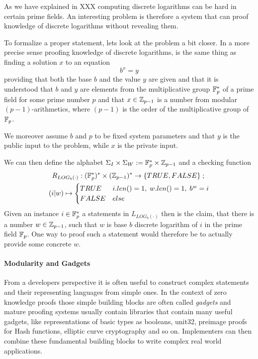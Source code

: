 \begin{example} As we have explained in XXX computing discrete logarithms can be hard in certain prime fields. An interesting problem is therefore a system that can proof knowledge of discrete logarithms without revealing them.

To formalize a proper statement, lets look at the problem a bit closer. In a more precise sense proofing knowledge of discrete logarithms, is the same thing as finding a solution $x$ to an equation
$$
b^x = y
$$ 
providing that both the base $b$ and the value $y$ are given and that it is understood that $b$ and $y$ are elements from the multiplicative group $\mathbb{F}_{p}^*$ of a prime field for some prime number $p$ and that $x\in \mathbb{Z}_{p-1}$ is a number from modular $(p-1)$-arithmetics, where $(p-1)$ is the order of the multiplicative group of $\mathbb{F}_p$.

We moreover assume $b$ and $p$ to be fixed system parameters and that $y$ is the public input to the problem, while $x$ is the private input. 

We can then define the alphabet $\Sigma_I \times \Sigma_W := \mathbb{F}_p^* \times \mathbb{Z}_{p-1}$ and a checking function
\begin{multline*}
R_{LOG_b(\cdot)} : (\mathbb{F}_p^*)^* \times (\mathbb{Z}_{p-1})^* \to \{TRUE, FALSE\}\;;\;\\
(i|w) \mapsto
\begin{cases}
TRUE & i.len()=1,\; w.len()=1,\; b^w = i\\
FALSE & else
\end{cases}
\end{multline*}
Given an instance $i\in \mathbb{F}_p^*$ a statements in $L_{LOG_b(\cdot)}$ then is the claim, that there is a number $w\in \mathbb{Z}_{p-1}$, such that $w$ is base $b$ discrete logarithm of $i$ in the prime field $\mathbb{F}_p$. One way to proof such a statement would therefore be to actually provide some concrete $w$. 
\end{example}
\paragraph{Modularity and Gadgets} From a developers perspective it is often useful to construct complex statements and their representing languages from simple ones. In the context of zero knowledge proofs those simple building blocks are often called \textit{gadgets} and mature proofing systems usually contain libraries that contain many useful gadgets, like representations of basic types as booleans, unit32, preimage proofs for Hash functions, elliptic curve cryptography and so on. Implementers can then combine these fundamental building blocks to write complex real world applications. 

